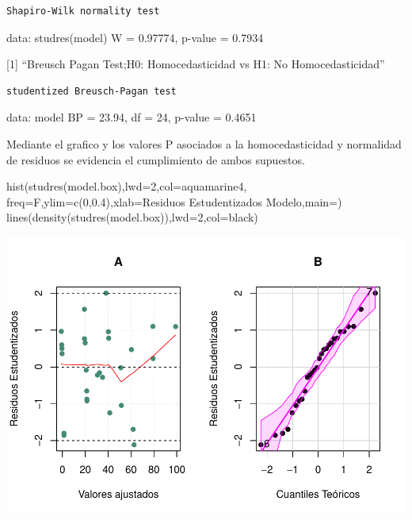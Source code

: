 \documentclass[
]{article}
\newenvironment{Shaded}{\begin{snugshade}}{\end{snugshade}}
\newcommand{\AttributeTok}[1]{\textcolor[rgb]{0.77,0.63,0.00}{#1}}
\newcommand{\DecValTok}[1]{\textcolor[rgb]{0.00,0.00,0.81}{#1}}
\newcommand{\FloatTok}[1]{\textcolor[rgb]{0.00,0.00,0.81}{#1}}
\newcommand{\FunctionTok}[1]{\textcolor[rgb]{0.00,0.00,0.00}{#1}}
\newcommand{\NormalTok}[1]{#1}
\newcommand{\StringTok}[1]{\textcolor[rgb]{0.31,0.60,0.02}{#1}}
\begin{document}
\begin{verbatim}
Shapiro-Wilk normality test
\end{verbatim}

data: studres(model) W = 0.97774, p-value = 0.7934

{[}1{]} ``Breusch Pagan Test;H0: Homocedasticidad vs H1: No
Homocedasticidad''

\begin{verbatim}
studentized Breusch-Pagan test
\end{verbatim}

data: model BP = 23.94, df = 24, p-value = 0.4651

Mediante el grafico y los valores P asociados a la homocedasticidad y
normalidad de residuos se evidencia el cumplimiento de ambos supuestos.

\begin{Shaded}
\begin{Highlighting}[]
\FunctionTok{hist}\NormalTok{(}\FunctionTok{studres}\NormalTok{(model.box),}\AttributeTok{lwd=}\DecValTok{2}\NormalTok{,}\AttributeTok{col=}\StringTok{\textquotesingle{}aquamarine4\textquotesingle{}}\NormalTok{,}
\AttributeTok{freq=}\NormalTok{F,}\AttributeTok{ylim=}\FunctionTok{c}\NormalTok{(}\DecValTok{0}\NormalTok{,}\FloatTok{0.4}\NormalTok{),}\AttributeTok{xlab=}\StringTok{\textquotesingle{}Residuos Estudentizados Modelo\textquotesingle{}}\NormalTok{,}\AttributeTok{main=}\StringTok{\textquotesingle{}\textquotesingle{}}\NormalTok{)}
\FunctionTok{lines}\NormalTok{(}\FunctionTok{density}\NormalTok{(}\FunctionTok{studres}\NormalTok{(model.box)),}\AttributeTok{lwd=}\DecValTok{2}\NormalTok{,}\AttributeTok{col=}\StringTok{\textquotesingle{}black\textquotesingle{}}\NormalTok{)}
\end{Highlighting}
\end{Shaded}

\includegraphics{Taller-2-Regresion-Multiple-Aplicada_files/figure-latex/unnamed-chunk-8-1.pdf}
\end{document}
